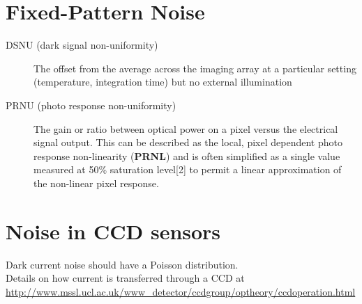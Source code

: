 \documentclass[10pt,fleqn]{article}
\begin{document}
\section{Fixed-Pattern Noise}

\begin{description}

\item[DSNU (dark signal non-uniformity)] The offset from the average across the imaging array at a particular setting (temperature, integration time) but no external illumination

\item[PRNU (photo response non-uniformity)] The gain or ratio between optical power on a pixel versus the electrical signal output. This can be described as the local, pixel dependent photo response non-linearity (\textbf{PRNL}) and is often simplified as a single value measured at 50\% saturation level[2] to permit a linear approximation of the non-linear pixel response.


\end{description}



\section{Noise in CCD sensors \cite{CCD-noise:2009}}

Dark current noise should have a Poisson distribution.\\
Details on how current is transferred through a CCD at \url{http://www.mssl.ucl.ac.uk/www_detector/ccdgroup/optheory/ccdoperation.html}
\end{document}
